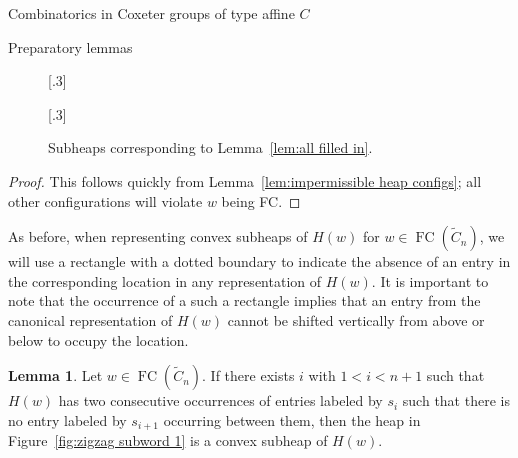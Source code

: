 \documentclass[11pt]{amsart}
\theoremstyle{definition}
\newtheorem{lemma}[theorem]{Lemma}
\numberwithin{equation}{section}
\newcommand{\C}{\widetilde{C}}
\renewcommand{\(}{\left(}
\renewcommand{\)}{\right)}
\DeclareMathOperator{\FC}{FC}
\newcommand\xxaxis{0}
\newcommand\yyaxis{90}
\newcommand\heapblock[3]{\fill[draw=black, fill=gray!30, rounded corners, line width=1.1pt, shift={(\xxaxis:#1)},shift={(\yyaxis:#2)}] (-1,-0.5) rectangle (1,0.5);\node at (#1,#2) {\scriptsize $#3$};}
\begin{document}
\begin{section}{Combinatorics in Coxeter groups of type affine $C$}
\begin{subsection}{Preparatory lemmas}
\begin{figure}[!ht]
\subcaptionbox{\label{fig:all filled in 1}}[.3\textwidth]{
}
\subcaptionbox{\label{fig:all filled in 2}}[.3\textwidth]{
}
\caption{Subheaps corresponding to Lemma~\ref{lem:all filled in}.}\label{fig:all filled in}
\end{figure}

\begin{proof}
This follows quickly from Lemma~\ref{lem:impermissible heap configs}; all other configurations will violate $w$ being FC.
\end{proof}

As before, when representing convex subheaps of $H(w)$ for $w\in \FC(\C_n)$, we will use a rectangle with a dotted boundary to indicate the absence of an entry in the corresponding location in any representation of $H(w)$.  It is important to note that the occurrence of a such a rectangle implies that an entry from the canonical representation of $H(w)$ cannot be shifted vertically from above or below to occupy the location.

\begin{lemma}\label{lem:zigzag subword}
Let $w \in \FC(\C_{n})$.  If there exists $i$ with $1<i < n+1$ such that $H(w)$ has two consecutive occurrences of entries labeled by $s_{i}$ such that there is no entry labeled by $s_{i+1}$ occurring between them, then the heap in Figure~\ref{fig:zigzag subword 1} is a convex subheap of $H(w)$.
\end{lemma}


\end{subsection}
\end{section}
\end{document}
